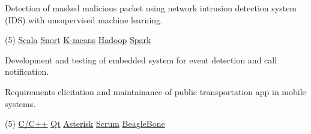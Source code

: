\documentclass[10pt,a4paper]{altacv}
\begin{document}


{\smallskip\justifying
{\faAngleRight} {\color{description}Detection of masked malicious packet using network intrusion detection system (IDS) with unsupervised machine learning.}
\par}

\vspace{-0.5mm}
\begin{tasks}[label-offset=0.5mm, item-indent=5.0mm, label-align=left, label={\scriptsize\faCode}, label-format={\scriptsize\color{tech}}, item-format={\bfseries\footnotesize\color{emphasis}}](5)
	\task \href{https://scala-lang.org}{Scala}
	\task \href{https://www.snort.org/}{Snort}
	\task \href{https://en.wikipedia.org/wiki/K-means_clustering}{K-means}
	\task \href{http://hadoop.apache.org/}{Hadoop}
	\task \href{https://spark.apache.org/}{Spark}
\end{tasks}

\divider

{\smallskip\justifying
{\faAngleRight} {\color{description}Development and testing of embedded system for event detection and call notification.}
\par}

{\smallskip\justifying
{\faAngleRight} {\color{description}Requirements elicitation and maintainance of public transportation app in mobile systems.}
\par}

\vspace{-0.5mm}
\begin{tasks}[label-offset=0.5mm, item-indent=5.0mm, label-align=left, label={\scriptsize\faCode}, label-format={\scriptsize\color{tech}}, item-format={\bfseries\footnotesize\color{emphasis}}](5)
	\task \href{https://www.cplusplus.com/}{C/C++}
	\task \href{https://www.qt.io/}{Qt}
	\task \href{https://www.asterisk.org/}{Asterisk}
	\task \href{http://www.scrummanifesto.org/}{Scrum}
	\task \href{http://beagleboard.org/}{BeagleBone}
\end{tasks}
\end{document}
